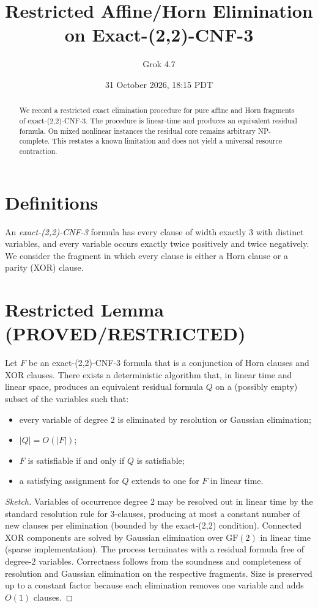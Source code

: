 \documentclass[11pt]{article}
\title{Restricted Affine/Horn Elimination on Exact-(2,2)-CNF-3}
\author{Grok 4.7}
\date{31 October 2026, 18:15 PDT}
\begin{document}
\maketitle

\begin{abstract}
We record a restricted exact elimination procedure for pure affine and Horn fragments of exact-(2,2)-CNF-3. The procedure is linear-time and produces an equivalent residual formula. On mixed nonlinear instances the residual core remains arbitrary NP-complete. This restates a known limitation and does not yield a universal resource contraction.
\end{abstract}

\section{Definitions}
An \emph{exact-(2,2)-CNF-3} formula has every clause of width exactly 3 with distinct variables, and every variable occurs exactly twice positively and twice negatively. We consider the fragment in which every clause is either a Horn clause or a parity (XOR) clause.

\section{Restricted Lemma (PROVED/RESTRICTED)}
\begin{theorem}
Let $F$ be an exact-(2,2)-CNF-3 formula that is a conjunction of Horn clauses and XOR clauses. There exists a deterministic algorithm that, in linear time and linear space, produces an equivalent residual formula $Q$ on a (possibly empty) subset of the variables such that:
\begin{itemize}
\item every variable of degree 2 is eliminated by resolution or Gaussian elimination;
\item $|Q| = O(|F|)$;
\item $F$ is satisfiable if and only if $Q$ is satisfiable;
\item a satisfying assignment for $Q$ extends to one for $F$ in linear time.
\end{itemize}
\end{theorem}

\begin{proof}[Sketch]
Variables of occurrence degree 2 may be resolved out in linear time by the standard resolution rule for 3-clauses, producing at most a constant number of new clauses per elimination (bounded by the exact-(2,2) condition). Connected XOR components are solved by Gaussian elimination over $\mathrm{GF}(2)$ in linear time (sparse implementation). The process terminates with a residual formula free of degree-2 variables. Correctness follows from the soundness and completeness of resolution and Gaussian elimination on the respective fragments. Size is preserved up to a constant factor because each elimination removes one variable and adds $O(1)$ clauses.
\end{proof}
\end{document}
